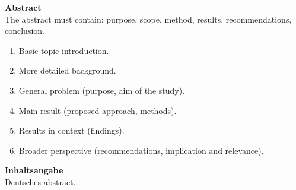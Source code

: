 \thispagestyle{empty}
{\huge\textbf{Abstract}}\\[5ex]
The abstract must contain: purpose, scope, method, results, recommendations, conclusion.

\begin{enumerate}
\item Basic topic introduction.
\item More detailed background.
\item General problem (purpose, aim of the study).
\item Main result (proposed approach, methods).
\item Results in context (findings).
\item Broader perspective (recommendations, implication and relevance).
\end{enumerate}
\vspace*{1cm}

{\huge\textbf{Inhaltsangabe}}\\[5ex]
Deutsches abstract.

\cleardoublepage